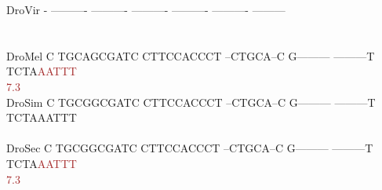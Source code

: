 \documentclass[11pt,twoside,reqno,a4paper]{article}
\begin{document}
{DroVir	-	----------	----------	----------	----------	----------	---------\\
\hspace*{7\charwidth}\hspace*{1\charwidth}\hspace*{1\charwidth}\hspace*{1\charwidth}\hspace*{1\charwidth}\hspace*{1\charwidth}\hspace*{1\charwidth}\\
\\
DroMel	C	TGCAGCGATC	CTTCCACCCT	--CTGCA--C	G---------	---------T	TCTA\textcolor{Brown}{A}\textcolor{Brown}{A}\textcolor{Brown}{T}\textcolor{Brown}{T}\textcolor{Brown}{T}\\
\hspace*{7\charwidth}\hspace*{1\charwidth}\hspace*{1\charwidth}\hspace*{1\charwidth}\hspace*{1\charwidth}\hspace*{1\charwidth}\hspace*{1\charwidth}\hspace*{55\charwidth}\textcolor{Brown}{7.3}\\
DroSim	C	TGCGGCGATC	CTTCCACCCT	--CTGCA--C	G---------	---------T	TCTAAATTT\\
\hspace*{7\charwidth}\hspace*{1\charwidth}\hspace*{1\charwidth}\hspace*{1\charwidth}\hspace*{1\charwidth}\hspace*{1\charwidth}\hspace*{1\charwidth}\\
DroSec	C	TGCGGCGATC	CTTCCACCCT	--CTGCA--C	G---------	---------T	TCTA\textcolor{Brown}{A}\textcolor{Brown}{A}\textcolor{Brown}{T}\textcolor{Brown}{T}\textcolor{Brown}{T}\\
\hspace*{7\charwidth}\hspace*{1\charwidth}\hspace*{1\charwidth}\hspace*{1\charwidth}\hspace*{1\charwidth}\hspace*{1\charwidth}\hspace*{1\charwidth}\hspace*{55\charwidth}\textcolor{Brown}{7.3}\\
}
\end{document}
